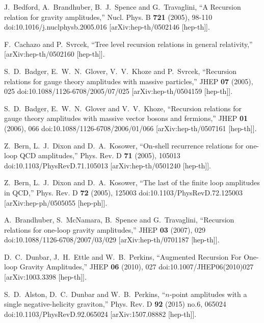 J.~Bedford, A.~Brandhuber, B.~J.~Spence and G.~Travaglini,
``A Recursion relation for gravity amplitudes,''
Nucl. Phys. B \textbf{721} (2005), 98-110
doi:10.1016/j.nuclphysb.2005.016
[arXiv:hep-th/0502146 [hep-th]].

F.~Cachazo and P.~Svrcek,
``Tree level recursion relations in general relativity,''
[arXiv:hep-th/0502160 [hep-th]].

S.~D.~Badger, E.~W.~N.~Glover, V.~V.~Khoze and P.~Svrcek,
``Recursion relations for gauge theory amplitudes with massive particles,''
JHEP \textbf{07} (2005), 025
doi:10.1088/1126-6708/2005/07/025
[arXiv:hep-th/0504159 [hep-th]].

S.~D.~Badger, E.~W.~N.~Glover and V.~V.~Khoze,
``Recursion relations for gauge theory amplitudes with massive vector bosons and fermions,''
JHEP \textbf{01} (2006), 066
doi:10.1088/1126-6708/2006/01/066
[arXiv:hep-th/0507161 [hep-th]].

Z.~Bern, L.~J.~Dixon and D.~A.~Kosower,
``On-shell recurrence relations for one-loop QCD amplitudes,''
Phys. Rev. D \textbf{71} (2005), 105013
doi:10.1103/PhysRevD.71.105013
[arXiv:hep-th/0501240 [hep-th]].

Z.~Bern, L.~J.~Dixon and D.~A.~Kosower,
``The last of the finite loop amplitudes in QCD,''
Phys. Rev. D \textbf{72} (2005), 125003
doi:10.1103/PhysRevD.72.125003
[arXiv:hep-ph/0505055 [hep-ph]].

A.~Brandhuber, S.~McNamara, B.~Spence and G.~Travaglini,
``Recursion relations for one-loop gravity amplitudes,''
JHEP \textbf{03} (2007), 029
doi:10.1088/1126-6708/2007/03/029
[arXiv:hep-th/0701187 [hep-th]].

D.~C.~Dunbar, J.~H.~Ettle and W.~B.~Perkins,
``Augmented Recursion For One-loop Gravity Amplitudes,''
JHEP \textbf{06} (2010), 027
doi:10.1007/JHEP06(2010)027
[arXiv:1003.3398 [hep-th]].

S.~D.~Alston, D.~C.~Dunbar and W.~B.~Perkins,
``$n$-point amplitudes with a single negative-helicity graviton,''
Phys. Rev. D \textbf{92} (2015) no.6, 065024
doi:10.1103/PhysRevD.92.065024
[arXiv:1507.08882 [hep-th]].


